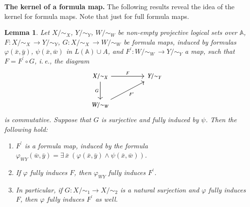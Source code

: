 \documentclass[12pt]{article}
\newtheorem{lemma}{Lemma}
\theoremstyle{definition}
\def\MA{{\mathbb{A}}}
\begin{document}
{\bf The kernel of a formula map.} 
The following results reveal the idea of the kernel for formula maps. Note that just for full formula maps.

\begin{lemma}\label{lemma:F}
Let $X/{\sim_X}$, $Y/{\sim_Y}$, $W/{\sim_W}$ be non-empty projective logical sets over $\MA$, $F\colon X/{\sim_X}\,\to Y/{\sim_Y}$, $G\colon X/{\sim_X}\,\to W/{\sim_W}$ be formula maps, induced by formulas $\varphi(\bar x,\bar y)$, $\psi(\bar x,\bar w)$ in $L(\MA)\cup A$, and $F^\prime\colon W/{\sim_W}\,\to Y/{\sim_Y}$ a map, such that $F=F^\prime\circ G$, i.\,e., the diagram
\begin{equation}\label{eq:varphi}
  \begin{tikzcd}[column sep=huge, row sep=large]
X/{\sim_X} \arrow[d, "G"'] \arrow[r, "F"] & Y/{\sim_Y} \\
W/{\sim_W} \arrow[ru, "{F^\prime}"'] & 
\end{tikzcd}  
\end{equation}
is commutative. Suppose that $G$ is surjective and fully induced by $\psi$. Then the following hold:
\begin{enumerate}
    \item $F^\prime$ is a formula map, induced by the formula $\varphi_{WY}(\bar w,\bar y)=\exists\,\bar x\:(\varphi(\bar x,\bar y)\wedge \psi(\bar x,\bar w))$.
    \item If $\varphi$ fully induces $F$, then $\varphi_{WY}$ fully induces $F^\prime$.
    \item In particular, if $G\colon X/{\sim_1}\to X/{\sim_2}$ is a natural surjection and $\varphi$ fully induces $F$, then $\varphi$  fully induces $F^\prime$ as well.
\end{enumerate} 
\end{lemma}
\end{document}
